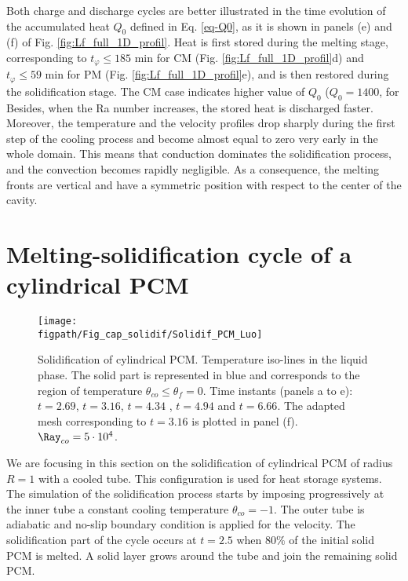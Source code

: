 Both charge and  discharge cycles are better illustrated in the time evolution of the accumulated heat $Q_0$ defined in Eq. \eqref{eq-Q0}, as it is shown in panels (e) and (f) of Fig.  \ref{fig:Lf_full_1D_profil}.
Heat is first stored during the melting stage, corresponding to $t_{\varphi} \leq 185$ min for CM (Fig. \ref{fig:Lf_full_1D_profil}d) and $t_{\varphi} \leq 59$ min for PM (Fig. \ref{fig:Lf_full_1D_profil}e), and is then restored during the solidification stage.
The CM case indicates higher value of $Q_0$ ($Q_0 = 1400$, for  
Besides, when the Ra number increases, the stored heat is discharged faster.
Moreover, the temperature and the velocity profiles drop sharply during the first step of the cooling process and become almost equal to zero very early in the whole domain.
This means that conduction dominates the solidification process, and the convection becomes rapidly negligible.
As a consequence, the melting fronts are vertical and have a symmetric position with respect to the center of the cavity. \\


\section{Melting-solidification cycle of a cylindrical PCM} \label{sec-cycle-cylindric}
\begin{figure}
\begin{center}
\begin{minipage}[t]{0.9\textwidth}
	\texttt{[image: \\figpath/Fig\_cap\_solidif/Solidif\_PCM\_Luo]}
\end{minipage}
\end{center}
\caption{Solidification of cylindrical PCM. Temperature iso-lines in the liquid phase. The solid part is represented in blue and corresponds to the region of temperature $\theta_{co} \leq \theta_f=0$. Time instants (panels  a to e): $t= 2.69$, $t = 3.16$, $t = 4.34$ , $t = 4.94$ and $t = 6.66$. The adapted mesh corresponding to $t = 3.16$ is plotted in panel (f).  $ \Ray_{co}=5 \cdot 10^4$.}\label{fig:cycle-cylindric-evol}
\end{figure}

We are focusing in this section on the solidification of cylindrical PCM of radius $R=1$ with a cooled tube. 
This configuration is used for heat storage systems.
The simulation of the solidification process starts by imposing progressively at the inner tube a constant cooling temperature $\theta_{co} = -1$.
The outer tube is adiabatic and no-slip boundary condition is applied for the velocity.
The solidification part of the cycle occurs at $t = 2.5$ when $80 \%$ of the initial solid PCM is melted.
A solid layer grows around the tube and join the remaining solid PCM.

